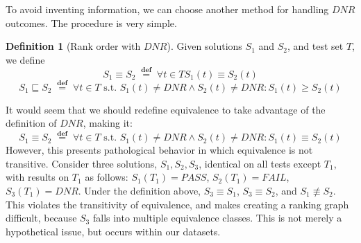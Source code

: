 \documentclass[11pt,twoside]{article}
\newcommand\dnr{\ensuremath{\mathit{DNR}}}
\newcommand\fail{\mathit{FAIL}}
\newcommand\pass{\mathit{PASS}}
\newcommand\defined{\mathrel{\;\stackrel{\scriptscriptstyle\mathbf{def}}{=}\;}}
\theoremstyle{definition}
\newtheorem{defn}{Definition}
\begin{document}
To avoid inventing information, we can choose another method for handling $\dnr$ outcomes. The procedure is very simple.
\begin{defn}[Rank order with $\dnr$]
Given solutions $S_1$ and $S_2$, and test set $T$, we define
$$S_1 \equiv S_2 \defined \forall t \in T S_1(t) \equiv S_2(t)$$
$$S_1 \sqsubseteq S_2 \defined \forall t \in T \mbox{ s.t. } S_1(t) \neq \dnr \wedge S_2(t) \neq \dnr : S_1(t) \geq S_2(t)$$
\end{defn}
It would seem that we should redefine equivalence to take advantage of the definition of $\dnr$, making it:
$$S_1 \equiv S_2 \defined \forall t \in T \mbox{ s.t. } S_1(t) \neq \dnr \wedge S_2(t) \neq \dnr : S_1(t) \equiv S_2(t)$$
However, this presents pathological behavior in which equivalence is not transitive. Consider three solutions, $S_1, S_2, S_3$, identical on all tests except $T_1$, with results on $T_1$ as follows: $S_1(T_1)=\pass$, $S_2(T_1)=\fail$, $S_3(T_1)=\dnr$. Under the definition above, $S_3 \equiv S_1$, $S_3 \equiv S_2$, and $S_1 \not \equiv S_2$. This violates the transitivity of equivalence, and makes creating a ranking graph difficult, because $S_3$ falls into multiple equivalence classes. This is not merely a hypothetical issue, but occurs within our datasets.
\end{document}
